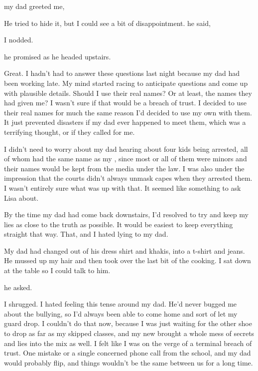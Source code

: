  my dad greeted me, 


He tried to hide it, but I could see a bit of disappointment.  he said, 

I nodded.

 he promised as he headed upstairs.

Great. I hadn't had to answer these questions last night because my dad had been working late. My mind started racing to anticipate questions and come up with plausible details. Should I use their real names? Or at least, the names they had given me? I wasn't sure if that would be a breach of trust. I decided to use their real names for much the same reason I'd decided to use my own with them. It just prevented disasters if my dad ever happened to meet them, which was a terrifying thought, or if they called for me.

I didn't need to worry about my dad hearing about four kids being arrested, all of whom had the same name as my , since most or all of them were minors and their names would be kept from the media under the law. I was also under the impression that the courts didn't always unmask capes when they arrested them. I wasn't entirely sure what was up with that. It seemed like something to ask Lisa about.

By the time my dad had come back downstairs, I'd resolved to try and keep my lies as close to the truth as possible. It would be easiest to keep everything straight that way. That, and I hated lying to my dad.

My dad had changed out of his dress shirt and khakis, into a t-shirt and jeans. He mussed up my hair and then took over the last bit of the cooking. I sat down at the table so I could talk to him.

 he asked.

I shrugged. I hated feeling this tense around my dad. He'd never bugged me about the bullying, so I'd always been able to come home and sort of let my guard drop. I couldn't do that now, because I was just waiting for the other shoe to drop as far as my skipped classes, and my new  brought a whole mess of secrets and lies into the mix as well. I felt like I was on the verge of a terminal breach of trust. One mistake or a single concerned phone call from the school, and my dad would probably flip, and things wouldn't be the same between us for a long time.


